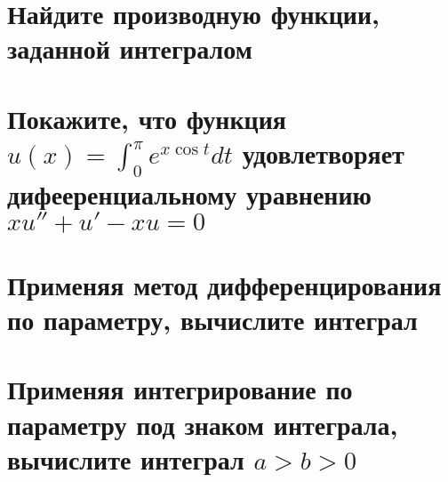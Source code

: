 \documentclass[a4paper, fleqn]{article}
\begin{document}
    \section*{Найдите производную функции, заданной интегралом}
    
    
    
    
    \section*{Покажите, что функция $u(x) = \int_0^{\pi} e^{x \cos t} dt$ удовлетворяет дифееренциальному
    уравнению $xu'' + u' - xu = 0$}
    
    \section*{Применяя метод дифференцирования по параметру, вычислите интеграл}
    
    
    
    
    \section*{Применяя интегрирование по параметру под знаком интеграла, вычислите интеграл $a > b > 0$}
    
    
\end{document}
